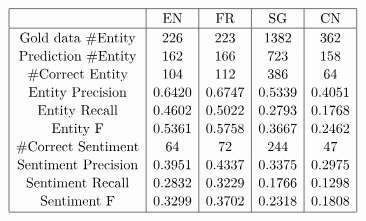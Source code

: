 \documentclass[12pt]{article}
\begin{document}
\[
\begin{array}{|c|c|c|c|c|}
\hline \rule{0pt}{1em}
& \mbox{EN} & \mbox{FR} & \mbox{SG} & \mbox{CN} \\
\hline \rule{0pt}{1em}
\mbox{Gold data \#Entity}  & 226    & 223    & 1382   & 362   \\[0.1em]
\mbox{Prediction \#Entity} & 162   & 166  & 723   & 158  \\[0.1em]
\mbox{\#Correct Entity}    & 104    & 112    & 386    & 64   \\[0.1em]
\mbox{Entity Precision}   & 0.6420 & 0.6747 & 0.5339 & 0.4051 \\[0.1em]
\mbox{Entity Recall}      & 0.4602 & 0.5022 & 0.2793 & 0.1768 \\[0.1em]
\mbox{Entity F}           & 0.5361 & 0.5758 & 0.3667 & 0.2462 \\[0.1em]
\mbox{\#Correct Sentiment} & 64     & 72     & 244    & 47    \\[0.1em]
\mbox{Sentiment Precision}& 0.3951 & 0.4337 & 0.3375 & 0.2975 \\[0.1em]
\mbox{Sentiment Recall}   & 0.2832 & 0.3229 & 0.1766 & 0.1298 \\[0.1em]
\mbox{Sentiment F}        & 0.3299 & 0.3702 & 0.2318 & 0.1808 \\[0.1em] 
\hline
\end{array}
\]
\end{document}
